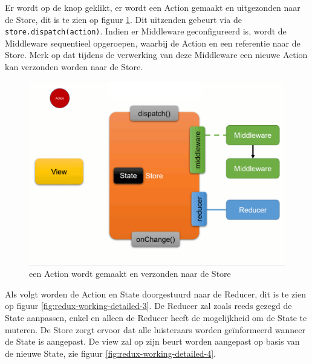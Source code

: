 Er wordt op de knop geklikt, er wordt een Action gemaakt en uitgezonden naar de Store, dit is te zien op figuur \ref{fig:redux-working-detailed-2}. Dit uitzenden gebeurt via de \verb|store.dispatch(action)|. Indien er Middleware geconfigureerd is, wordt de Middleware sequentieel opgeroepen, waarbij de Action en een referentie naar de Store. Merk op dat tijdens de verwerking van deze Middleware een nieuwe Action kan verzonden worden naar de Store.

\begin{figure}[H]
    \centering
    \includegraphics[width=\figureWidthModifier\linewidth]{img/stand-van-zaken/redux-working-detailed-2.png}
    \caption{een Action wordt gemaakt en verzonden naar de Store}
    \label{fig:redux-working-detailed-2}
\end{figure}

Als volgt worden de Action en State doorgestuurd naar de Reducer, dit is te zien op figuur \ref{fig:redux-working-detailed-3}. De Reducer zal zoals reeds gezegd de State aanpassen, enkel en alleen de Reducer heeft de mogelijkheid om de State te muteren. 
De Store zorgt ervoor dat alle luisteraars worden geïnformeerd wanneer de State is aangepast. De view zal op zijn beurt worden aangepast op basis van de nieuwe State, zie figuur \ref{fig:redux-working-detailed-4}.

